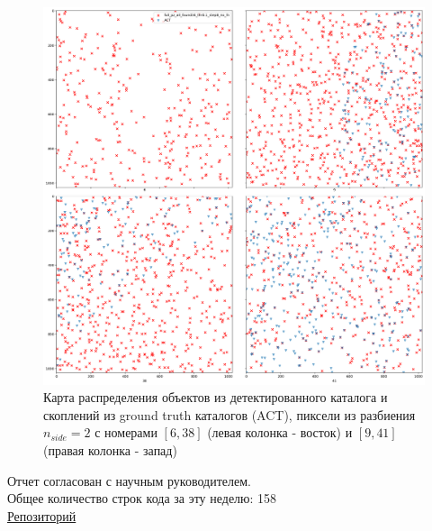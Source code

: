\documentclass{article}
\begin{document}
\begin{figure}[h]
\includegraphics[width=\linewidth]{map_act}
\caption{Карта распределения объектов из детектированного каталога и скоплений из ground truth 
    каталогов (ACT), пиксели из разбиения $n_{side}=2$ с номерами
    $[6, 38]$ (левая колонка - восток) и $[9, 41]$ (правая колонка - запад)}
\label{Fig:Map_ACT}
\end{figure}
Отчет согласован с научным руководителем.\\
Общее количество строк кода за эту неделю: 158\\
\href{https://github.com/rt2122/data-segmentation-2}{Репозиторий}\\ 
\end{document}
